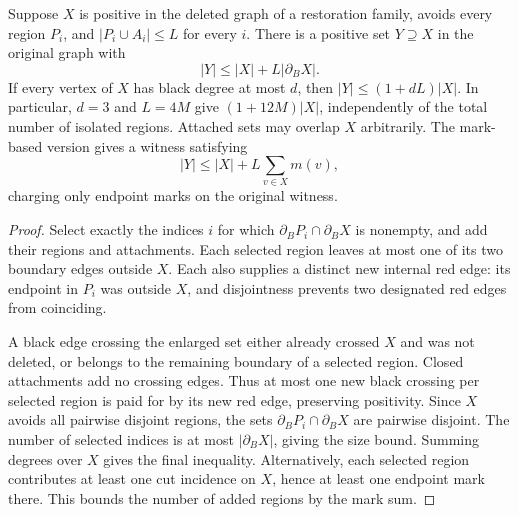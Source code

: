 \begin{theorem}
  \label{thm:lowerbounds-algebraic-family-restoration}
  \leanok
  Suppose $X$ is positive in the deleted graph of a restoration family,
  avoids every region $P_i$, and $|P_i\cup A_i|\le L$ for every $i$.
  There is a positive set $Y\supseteq X$ in the original graph with
  \[
    |Y|\le |X|+L|\partial_B X|.
  \]
  If every vertex of $X$ has black degree at most $d$, then
  $|Y|\le(1+dL)|X|$. In particular, $d=3$ and $L=4M$ give
  $(1+12M)|X|$, independently of the total number of isolated regions.
  Attached sets may overlap $X$ arbitrarily.
  The mark-based version gives a witness satisfying
  \[
    |Y|\le |X|+L\sum_{v\in X}m(v),
  \]
  charging only endpoint marks on the original witness.
\end{theorem}
\begin{proof}
  \leanok
  Select exactly the indices $i$ for which
  $\partial_B P_i\cap\partial_B X$ is nonempty, and add their regions
  and attachments. Each selected region leaves at most one of its two
  boundary edges outside $X$. Each also supplies a distinct new internal
  red edge: its endpoint in $P_i$ was outside $X$, and disjointness prevents
  two designated red edges from coinciding.

  A black edge crossing the enlarged set either already crossed $X$
  and was not deleted, or belongs to the remaining boundary of a selected
  region. Closed attachments add no crossing edges. Thus at most one
  new black crossing per selected region is paid for by its new red edge,
  preserving positivity. Since $X$ avoids all pairwise disjoint regions,
  the sets $\partial_B P_i\cap\partial_B X$ are pairwise disjoint.
  The number of selected indices is at most $|\partial_B X|$, giving
  the size bound. Summing degrees over $X$ gives the final inequality.
  Alternatively, each selected region contributes at least one cut
  incidence on $X$, hence at least one endpoint mark there. This bounds
  the number of added regions by the mark sum.
\end{proof}

